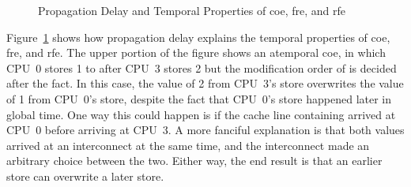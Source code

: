 \documentclass[10]{article}
\begin{document}
\begin{figure}[tb]
\begin{center}
\caption{Propagation Delay and Temporal Properties of coe, fre, and rfe}
\label{fig:Propagation Delay and Temporal Properties of coe, fre, and rfe}
\end{center}
\end{figure}

Figure~\ref{fig:Propagation Delay and Temporal Properties of coe, fre, and rfe}
shows how propagation delay explains the temporal properties of coe,
fre, and rfe.
The upper portion of the figure shows an atemporal coe, in which
CPU~0 stores 1 to  after CPU~3 stores 2 but
the modification order of  is decided after the fact.
In this case, the value of 2 from CPU~3's store overwrites the value
of 1 from CPU~0's store, despite the fact that CPU~0's store
happened later in global time.
One way this could happen is if the cache line containing
 arrived at CPU~0 before arriving at CPU~3.
A more fanciful explanation is that both values arrived at an
interconnect at the same time, and the interconnect made an
arbitrary choice between the two.
Either way, the end result is that an earlier store can overwrite
a later store.
\end{document}
